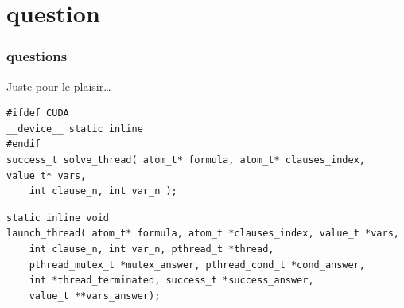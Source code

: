 \documentclass{beamer}
\begin{document}
\section*{question}

\begin{frame}
\frametitle{questions}
\end{frame}

Juste pour le plaisir\ldots{}  \\

\begin{lstlisting}
#ifdef CUDA
__device__ static inline
#endif
success_t solve_thread( atom_t* formula, atom_t* clauses_index, value_t* vars, 
    int clause_n, int var_n );
\end{lstlisting}

\begin{lstlisting}
static inline void 
launch_thread( atom_t* formula, atom_t *clauses_index, value_t *vars, 
    int clause_n, int var_n, pthread_t *thread,
    pthread_mutex_t *mutex_answer, pthread_cond_t *cond_answer, 
    int *thread_terminated, success_t *success_answer, 
    value_t **vars_answer);
\end{lstlisting}

\end{document}
